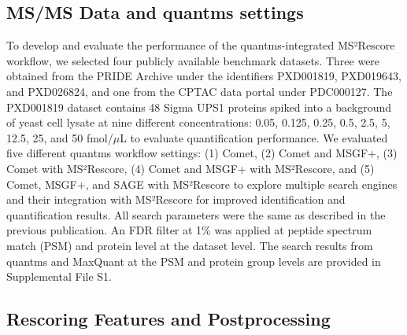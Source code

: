 \documentclass[12pt]{article}
\begin{document}
\subsection{MS/MS Data and quantms settings}
To develop and evaluate the performance of the quantms-integrated MS²Rescore workflow, we selected four publicly available benchmark datasets. Three were obtained from the PRIDE Archive under the identifiers PXD001819, PXD019643, and PXD026824, and one from the CPTAC data portal under PDC000127. %
The PXD001819 dataset contains 48 Sigma UPS1 proteins spiked into a background of yeast cell lysate at nine different concentrations: 0.05, 0.125, 0.25, 0.5, 2.5, 5, 12.5, 25, and 50 fmol/$\mu$L to evaluate quantification performance. %
We evaluated five different quantms workflow settings: (1) Comet, (2) Comet and MSGF+, (3) Comet with MS²Rescore, (4) Comet and MSGF+ with MS²Rescore, and (5) Comet, MSGF+, and SAGE with MS²Rescore to explore multiple search engines and their integration with MS²Rescore for improved identification and quantification results. All search parameters were the same as described in the previous publication. An FDR filter at 1\% was applied at peptide spectrum match (PSM) and protein level at the dataset level. %
The search results from quantms and MaxQuant at the PSM and protein group levels are provided in Supplemental File S1.

\subsection{Rescoring Features and Postprocessing}
\end{document}

